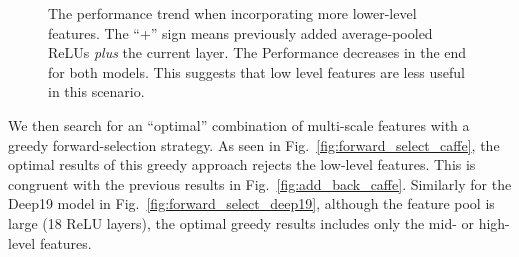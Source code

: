 \documentclass[10pt,twocolumn,letterpaper]{article}
\begin{document}

\begin{figure}[htbp]
\centering
\caption{The performance trend when incorporating more lower-level features. The ``+'' sign means previously added average-pooled ReLUs \textit{plus} the current layer. The Performance decreases in the end for both models. This suggests that low level features are less useful in this scenario.}
\label{fig:add_back}
\end{figure}


We then search for an ``optimal'' combination of multi-scale features with a greedy forward-selection strategy. As seen in Fig.~\ref{fig:forward_select_caffe}, the optimal results of this greedy approach rejects the low-level features. This is congruent with the previous results in Fig.~\ref{fig:add_back_caffe}. Similarly for the Deep19 model in Fig.~\ref{fig:forward_select_deep19}, although the feature pool is large (18 ReLU layers), the optimal greedy results includes only the mid- or high-level features. 
\end{document}
